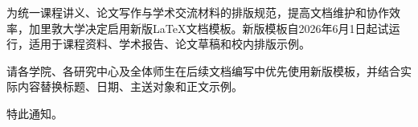 \documentclass[
	titlefont={方正小标宋简体},
	font=华文仿宋,
]{officedoc}
\begin{document}
\makeofficedochead

\makeofficedoctitle

为统一课程讲义、论文写作与学术交流材料的排版规范，提高文档维护和协作效率，加里敦大学决定启用新版\LaTeX{}文档模板。新版模板自2026年6月1日起试运行，适用于课程资料、学术报告、论文草稿和校内排版示例。

请各学院、各研究中心及全体师生在后续文档编写中优先使用新版模板，并结合实际内容替换标题、日期、主送对象和正文示例。

特此通知。

\makeofficedocsignature
\end{document}

